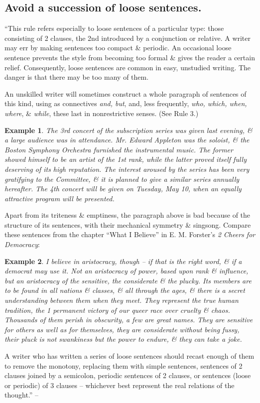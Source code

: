 \documentclass{article}
\numberwithin{equation}{section}
\newtheorem{example}{Example}[section]
\begin{document}

\subsection{Avoid a succession of loose sentences.}
``This rule refers especially to loose sentences of a particular type: those consisting of 2 clauses, the 2nd introduced by a conjunction or relative. A writer may err by making sentences too compact \& periodic. An occasional loose sentence prevents the style from becoming too formal \& gives the reader a certain relief. Consequently, loose sentences are common in easy, unstudied writing. The danger is that there may be too many of them.

An unskilled writer will sometimes construct a whole paragraph of sentences of this kind, using as connectives \textit{and, but}, and, less frequently, \textit{who, which, when, where}, \& \textit{while}, these last in nonrestrictive senses. (See Rule 3.)
\begin{example}
	The 3rd concert of the subscription series was given last evening, \& a large audience was in attendance. Mr. Edward Appleton was the soloist, \& the Boston Symphony Orchestra furnished the instrumental music. The former showed himself to be an artist of the 1st rank, while the latter proved itself fully deserving of its high reputation. The interest aroused by the series has been very gratifying to the Committee, \& it is planned to give a similar series annually hereafter. The 4th concert will be given on Tuesday, May 10, when an equally attractive program will be presented.
\end{example}
Apart from its triteness \& emptiness, the paragraph above is bad because of the structure of its sentences, with their mechanical symmetry \& singsong. Compare these sentences from the chapter ``What I Believe'' in E. M. Forster's \textit{2 Cheers for Democracy}:
\begin{example}
	I believe in aristocracy, though -- if that is the right word, \& if a democrat may use it. Not an aristocracy of power, based upon rank \& influence, but an aristocracy of the sensitive, the considerate \& the plucky. Its members are to be found in all nations \& classes, \& all through the ages, \& there is a secret understanding between them when they meet. They represent the true human tradition, the 1 permanent victory of our queer race over cruelty \& chaos. Thousands of them perish in obscurity, a few are great names. They are sensitive for others as well as for themselves, they are considerate without being fussy, their pluck is not swankiness but the power to endure, \& they can take a joke.
\end{example}
A writer who has written a series of loose sentences should recast enough of them to remove the monotony, replacing them with simple sentences, sentences of 2 clauses joined by a semicolon, periodic sentences of 2 clauses, or sentences (loose or periodic) of 3 clauses -- whichever best represent the real relations of the thought.'' -- \cite[pp. 39--40]{Strunk_White2019}
\end{document}
